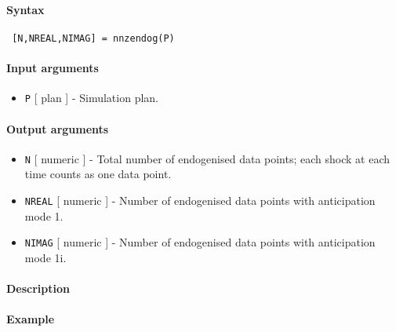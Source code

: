 


	\paragraph{Syntax}
 
 \begin{verbatim}
 [N,NREAL,NIMAG] = nnzendog(P)
 \end{verbatim}
 
 \paragraph{Input arguments}
 
 \begin{itemize}
 \item
   \texttt{P} {[} plan {]} - Simulation plan.
 \end{itemize}
 
 \paragraph{Output arguments}
 
 \begin{itemize}
 \item
   \texttt{N} {[} numeric {]} - Total number of endogenised data points;
   each shock at each time counts as one data point.
 \item
   \texttt{NREAL} {[} numeric {]} - Number of endogenised data points
   with anticipation mode 1.
 \item
   \texttt{NIMAG} {[} numeric {]} - Number of endogenised data points
   with anticipation mode 1i.
 \end{itemize}
 
 \paragraph{Description}
 
 \paragraph{Example}


